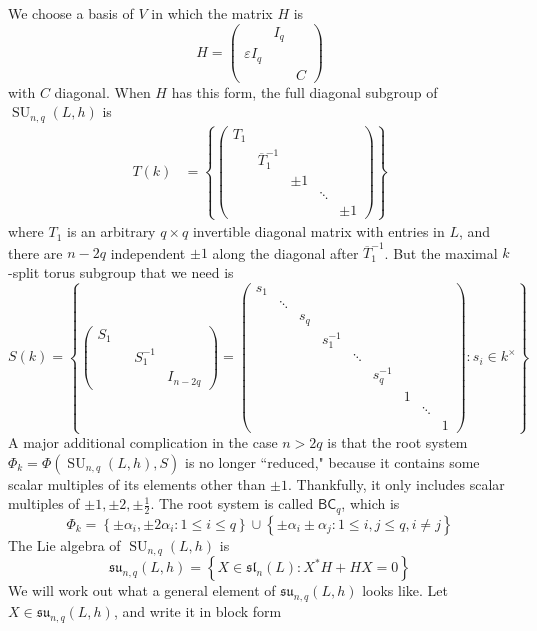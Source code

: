 \documentclass[12pt]{article}
\theoremstyle{definition}
\numberwithin{theorem}{subsection}
\newcommand{\eps}{\varepsilon}
\newcommand{\lb}{\left\{}
\newcommand{\rb}{\right\}}
\newcommand{\inv}{^{-1}}
\newcommand{\ov}{\overline}
\newcommand{\fraksl}{\mathfrak{sl}}
\newcommand{\fraksu}{\mathfrak{su}}
\DeclareMathOperator{\SU}{SU}
\begin{document}
We choose a basis of $V$ in which the matrix $H$ is
\[
	H = 
	\begin{pmatrix}
	 	 & I_q &  \\
		\eps I_q &  & \\
		 &  & C
	\end{pmatrix}
\]
with $C$ diagonal. When $H$ has this form, the full diagonal subgroup of $\SU_{n,q}(L,h)$ is
\begin{align*}
	T(k) &=
	\lb
		\begin{pmatrix}
			T_1 \\
			& \ov T_1 \inv \\
			&& \pm 1 \\
			&&& \ddots \\
			&&&& \pm 1
		\end{pmatrix} 
	\rb
\end{align*}
where $T_1$ is an arbitrary $q \times q$ invertible diagonal matrix with entries in $L$, and there are $n-2q$ independent $\pm 1$ along the diagonal after $\ov T_1 \inv$. But the maximal $k$-split torus subgroup that we need is
\[
	S(k) =
	\lb
	\begin{pmatrix}
		S_1 \\
		&& S_1 \inv \\
		&&& I_{n-2q}
	\end{pmatrix}
	=
	\begin{pmatrix}
		s_1 \\
		& \ddots \\
		&& s_q \\
		&&& s_1 \inv \\
		&&&& \ddots \\
		&&&&& s_q \inv \\
		&&&&&& 1 \\ 
		&&&&&&& \ddots \\
		&&&&&&&& 1
	\end{pmatrix}
	: s_i \in k^\times
	\rb
\]
A major additional complication in the case $n > 2q$ is that the root system $\Phi_k = \Phi(\SU_{n,q}(L,h), S)$ is no longer ``reduced," because it contains some scalar multiples of its elements other than $\pm 1$. Thankfully, it only includes scalar multiples of $\pm 1, \pm 2, \pm \frac 12$. The root system is called $\mathsf{BC}_q$, which is
\[
	\Phi_k = \lb \pm \alpha_i, \pm 2 \alpha_i : 1 \le i \le q \rb \cup \lb \pm \alpha_i \pm \alpha_j : 1 \le i, j \le q, i \neq j \rb
\]
The Lie algebra of $\SU_{n,q}(L,h)$ is
\[
	\fraksu_{n,q}(L,h) = \lb X \in \fraksl_n(L) : X^* H + H X = 0 \rb
\]
We will work out what a general element of $\fraksu_{n,q}(L,h)$ looks like. Let $X \in \fraksu_{n,q}(L,h)$, and write it in block form
\end{document}
